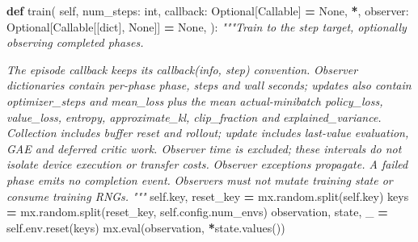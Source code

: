 \documentclass[
  american,
  11pt,
  letterpaper,
]{article}
\newenvironment{Shaded}{\begin{snugshade}}{\end{snugshade}}
\newcommand{\BuiltInTok}[1]{#1}
\newcommand{\CommentTok}[1]{\textcolor[rgb]{0.56,0.35,0.01}{\textit{#1}}}
\newcommand{\KeywordTok}[1]{\textcolor[rgb]{0.13,0.29,0.53}{\textbf{#1}}}
\newcommand{\NormalTok}[1]{#1}
\newcommand{\OperatorTok}[1]{\textcolor[rgb]{0.81,0.36,0.00}{\textbf{#1}}}
\newcommand{\VariableTok}[1]{\textcolor[rgb]{0.00,0.00,0.00}{#1}}
\renewenvironment{Shaded}{\par\smallskip}{\par\smallskip}
\begin{document}
\begin{Shaded}
\begin{Highlighting}[]
    \KeywordTok{def}\NormalTok{ train(}
        \VariableTok{self}\NormalTok{,}
\NormalTok{        num\_steps: }\BuiltInTok{int}\NormalTok{,}
\NormalTok{        callback: Optional[Callable] }\OperatorTok{=} \VariableTok{None}\NormalTok{,}
        \OperatorTok{*}\NormalTok{,}
\NormalTok{        observer: Optional[Callable[[}\BuiltInTok{dict}\NormalTok{], }\VariableTok{None}\NormalTok{]] }\OperatorTok{=} \VariableTok{None}\NormalTok{,}
\NormalTok{    ):}
        \CommentTok{"""Train to the step target, optionally observing completed phases.}

\CommentTok{        The episode callback keeps its \textasciigrave{}\textasciigrave{}callback(info, step)\textasciigrave{}\textasciigrave{} convention.}
\CommentTok{        Observer dictionaries contain per{-}phase \textasciigrave{}\textasciigrave{}phase\textasciigrave{}\textasciigrave{}, \textasciigrave{}\textasciigrave{}steps\textasciigrave{}\textasciigrave{} and wall}
\CommentTok{        \textasciigrave{}\textasciigrave{}seconds\textasciigrave{}\textasciigrave{}; updates also contain \textasciigrave{}\textasciigrave{}optimizer\_steps\textasciigrave{}\textasciigrave{} and \textasciigrave{}\textasciigrave{}mean\_loss\textasciigrave{}\textasciigrave{}}
\CommentTok{        plus the mean actual{-}minibatch \textasciigrave{}\textasciigrave{}policy\_loss\textasciigrave{}\textasciigrave{}, \textasciigrave{}\textasciigrave{}value\_loss\textasciigrave{}\textasciigrave{},}
\CommentTok{        \textasciigrave{}\textasciigrave{}entropy\textasciigrave{}\textasciigrave{}, \textasciigrave{}\textasciigrave{}approximate\_kl\textasciigrave{}\textasciigrave{}, \textasciigrave{}\textasciigrave{}clip\_fraction\textasciigrave{}\textasciigrave{} and}
\CommentTok{        \textasciigrave{}\textasciigrave{}explained\_variance\textasciigrave{}\textasciigrave{}.}
\CommentTok{        Collection includes buffer reset and rollout; update includes last{-}value}
\CommentTok{        evaluation, GAE and deferred critic work. Observer time is excluded;}
\CommentTok{        these intervals do not isolate device execution or transfer costs.}
\CommentTok{        Observer exceptions propagate. A failed phase emits no completion event.}
\CommentTok{        Observers must not mutate training state or consume training RNGs.}
\CommentTok{        """}
        \VariableTok{self}\NormalTok{.key, reset\_key }\OperatorTok{=}\NormalTok{ mx.random.split(}\VariableTok{self}\NormalTok{.key)}
\NormalTok{        keys }\OperatorTok{=}\NormalTok{ mx.random.split(reset\_key, }\VariableTok{self}\NormalTok{.config.num\_envs)}
\NormalTok{        observation, state, \_ }\OperatorTok{=} \VariableTok{self}\NormalTok{.env.reset(keys)}
\NormalTok{        mx.}\BuiltInTok{eval}\NormalTok{(observation, }\OperatorTok{*}\NormalTok{state.values())}


\end{Highlighting}
\end{Shaded}
\end{document}
